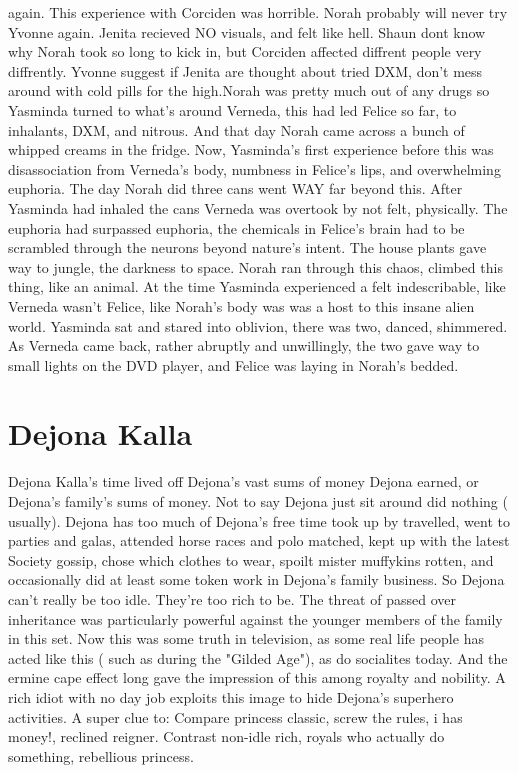 \documentclass[12pt]{book}
\begin{document}
again. This experience with Corciden was horrible. Norah probably will never try Yvonne again. Jenita recieved NO visuals, and felt like hell. Shaun dont know why Norah took so long to kick in, but Corciden affected diffrent people very diffrently. Yvonne suggest if Jenita are thought about tried DXM, don't mess around with cold pills for the high.Norah was pretty much out of any drugs so Yasminda turned to what's around Verneda, this had led Felice so far, to inhalants, DXM, and nitrous. And that day Norah came across a bunch of whipped creams in the fridge. Now, Yasminda's first experience before this was disassociation from Verneda's body, numbness in Felice's lips, and overwhelming euphoria. The day Norah did three cans went WAY far beyond this. After Yasminda had inhaled the cans Verneda was overtook by not felt, physically. The euphoria had surpassed euphoria, the chemicals in Felice's brain had to be scrambled through the neurons beyond nature's intent. The house plants gave way to jungle, the darkness to space. Norah ran through this chaos, climbed this thing, like an animal. At the time Yasminda experienced a felt indescribable, like Verneda wasn't Felice, like Norah's body was was a host to this insane alien world. Yasminda sat and stared into oblivion, there was two, danced, shimmered. As Verneda came back, rather abruptly and unwillingly, the two gave way to small lights on the DVD player, and Felice was laying in Norah's bedded.



\chapter{Dejona Kalla}

Dejona Kalla's time lived off Dejona's vast sums of money Dejona earned, or Dejona's family's sums of money. Not to say Dejona just sit around did nothing ( usually). Dejona has too much of Dejona's free time took up by travelled, went to parties and galas, attended horse races and polo matched, kept up with the latest Society gossip, chose which clothes to wear, spoilt mister muffykins rotten, and occasionally did at least some token work in Dejona's family business. So Dejona can't really be too idle. They're too rich to be. The threat of passed over inheritance was particularly powerful against the younger members of the family in this set. Now this was some truth in television, as some real life people has acted like this ( such as during the "Gilded Age"), as do socialites today. And the ermine cape effect long gave the impression of this among royalty and nobility. A rich idiot with no day job exploits this image to hide Dejona's superhero activities. A super clue to: Compare princess classic, screw the rules, i has money!, reclined reigner. Contrast non-idle rich, royals who actually do something, rebellious princess.
\end{document}

